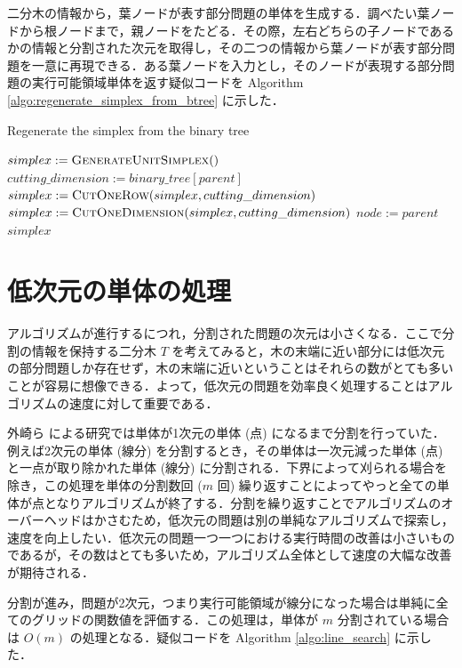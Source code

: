 \documentclass[a4paper,11pt]{jreport}
\begin{document}
二分木の情報から，葉ノードが表す部分問題の単体を生成する．調べたい葉ノードから根ノードまで，親ノードをたどる．その際，左右どちらの子ノードであるかの情報と分割された次元を取得し，その二つの情報から葉ノードが表す部分問題を一意に再現できる．ある葉ノードを入力とし，そのノードが表現する部分問題の実行可能領域単体を返す疑似コードを Algorithm \ref{algo:regenerate_simplex_from_btree} に示した．\par

\begin{algorithm}
\caption{Regenerate the simplex from the binary tree}
\label{algo:regenerate_simplex_from_btree}
\begin{algorithmic}[1]
\State $ simplex := \Call{GenerateUnitSimplex} $
\State $ cutting\_dimension := binary\_tree[parent] $
\State $ simplex := \Call{CutOneRow}{simplex, cutting\_dimension} $
\State $ simplex := \Call{CutOneDimension}{simplex,  cutting\_dimension} $
\EndIf
\State $ node := parent $
\EndWhile
\State \Return $ simplex $
\EndFunction
\end{algorithmic}
\end{algorithm}

\section{低次元の単体の処理}

アルゴリズムが進行するにつれ，分割された問題の次元は小さくなる．ここで分割の情報を保持する二分木 $ T $ を考えてみると，木の末端に近い部分には低次元の部分問題しか存在せず，木の末端に近いということはそれらの数がとても多いことが容易に想像できる．よって，低次元の問題を効率良く処理することはアルゴリズムの速度に対して重要である．\par
外崎ら \cite{tonosaki} による研究では単体が1次元の単体 (点) になるまで分割を行っていた．例えば2次元の単体 (線分) を分割するとき，その単体は一次元減った単体 (点) と一点が取り除かれた単体 (線分) に分割される．下界によって刈られる場合を除き，この処理を単体の分割数回 ($ m $ 回) 繰り返すことによってやっと全ての単体が点となりアルゴリズムが終了する．分割を繰り返すことでアルゴリズムのオーバーヘッドはかさむため，低次元の問題は別の単純なアルゴリズムで探索し，速度を向上したい．低次元の問題一つ一つにおける実行時間の改善は小さいものであるが，その数はとても多いため，アルゴリズム全体として速度の大幅な改善が期待される．\par
分割が進み，問題が2次元，つまり実行可能領域が線分になった場合は単純に全てのグリッドの関数値を評価する．この処理は，単体が $ m $ 分割されている場合は $ O(m) $ の処理となる．疑似コードを Algorithm \ref{algo:line_search} に示した．\par
\end{document}

